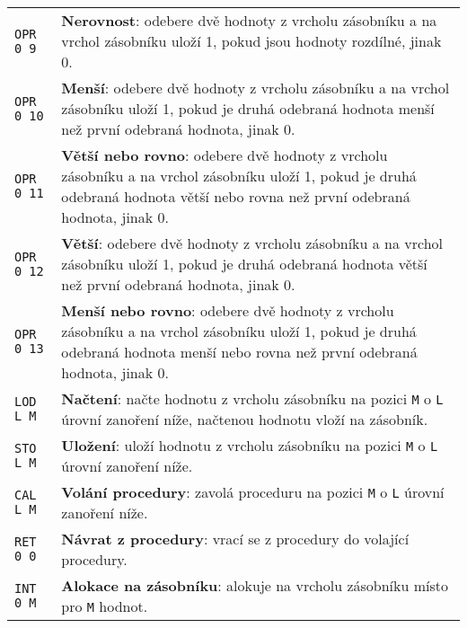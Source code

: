 \documentclass{article}
\begin{document}
\begin{longtable}{|l| p{10cm}|}
		\rule{0pt}{4ex} \texttt{OPR 0 9} & \textbf{Nerovnost}: odebere dvě hodnoty z vrcholu zásobníku a na vrchol zásobníku uloží 1, pokud jsou hodnoty rozdílné, jinak 0. \\
		
		\rule{0pt}{4ex} \texttt{OPR 0 10} & \textbf{Menší}: odebere dvě hodnoty z vrcholu zásobníku a na vrchol zásobníku uloží 1, pokud je druhá odebraná hodnota menší než první odebraná hodnota, jinak 0. \\
		
		\rule{0pt}{4ex} \texttt{OPR 0 11} & \textbf{Větší nebo rovno}: odebere dvě hodnoty z vrcholu zásobníku a na vrchol zásobníku uloží 1, pokud je druhá odebraná hodnota větší nebo rovna než první odebraná hodnota, jinak 0. \\
		
		\rule{0pt}{4ex} \texttt{OPR 0 12} & \textbf{Větší}: odebere dvě hodnoty z vrcholu zásobníku a na vrchol zásobníku uloží 1, pokud je druhá odebraná hodnota větší než první odebraná hodnota, jinak 0. \\
		
		\rule{0pt}{4ex} \texttt{OPR 0 13} & \textbf{Menší nebo rovno}: odebere dvě hodnoty z vrcholu zásobníku a na vrchol zásobníku uloží 1, pokud je druhá odebraná hodnota menší nebo rovna než první odebraná hodnota, jinak 0. \\ \hline
		
		\rule{0pt}{3ex} \texttt{LOD L M} & \textbf{Načtení}: načte hodnotu z vrcholu zásobníku na pozici \texttt{M} o \texttt{L} úrovní zanoření níže, načtenou hodnotu vloží na zásobník. \\
		\hline
		
		\rule{0pt}{3ex} \texttt{STO L M} & \textbf{Uložení}: uloží hodnotu z vrcholu zásobníku na pozici \texttt{M} o \texttt{L} úrovní zanoření níže. \\ \hline
		
		\rule{0pt}{3ex} \texttt{CAL L M} & \textbf{Volání procedury}: zavolá proceduru na pozici \texttt{M} o \texttt{L} úrovní zanoření níže. \\ \hline
		
		\rule{0pt}{3ex} \texttt{RET 0 0} & \textbf{Návrat z procedury}: vrací se z procedury do volající procedury. \\ \hline
		
		\rule{0pt}{3ex} \texttt{INT 0 M} & \textbf{Alokace na zásobníku}: alokuje na vrcholu zásobníku místo pro \texttt{M} hodnot. \\ \hline
		

\end{longtable}
\end{document}
